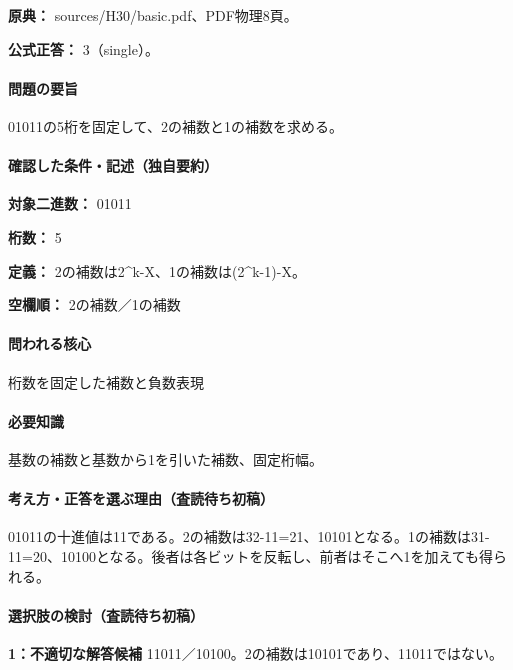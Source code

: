 \noindent\textbf{原典：} sources/H30/basic.pdf、PDF物理8頁。

\textbf{公式正答：} 3（single）。

\paragraph{問題の要旨} 01011の5桁を固定して、2の補数と1の補数を求める。

\paragraph{確認した条件・記述（独自要約）}\mbox{}\par

\noindent\textbf{対象二進数：} 01011\par

\noindent\textbf{桁数：} 5\par

\noindent\textbf{定義：} 2の補数は2\textasciicircum{}k-X、1の補数は(2\textasciicircum{}k-1)-X。\par

\noindent\textbf{空欄順：} 2の補数／1の補数\par

\paragraph{問われる核心} 桁数を固定した補数と負数表現

\paragraph{必要知識} 基数の補数と基数から1を引いた補数、固定桁幅。

\paragraph{考え方・正答を選ぶ理由（査読待ち初稿）} 01011の十進値は11である。2の補数は32-11=\allowbreak{}21、10101となる。1の補数は31-11=\allowbreak{}20、10100となる。後者は各ビットを反転し、前者はそこへ1を加えても得られる。

\paragraph{選択肢の検討（査読待ち初稿）}\mbox{}\par

\noindent\textbf{1：不適切な解答候補} 11011／10100。2の補数は10101であり、11011ではない。\par


